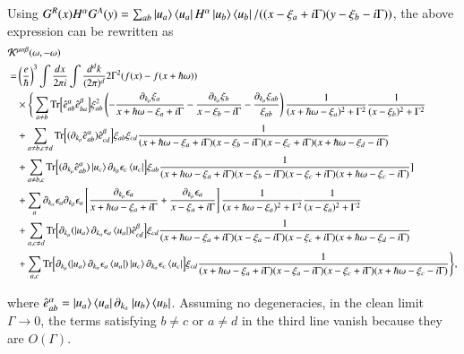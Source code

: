 \documentclass[twocolumn,superscriptaddress]{revtex4-1}
\begin{document}
\begin{widetext}
Using $G^R(x) H^\alpha G^A(y)=\sum_{ab}\ket{u_a}\bra{u_a}H^\alpha\ket{u_b}\bra{u_b}/((x-\xi_a+i\Gamma)(y-\xi_b-i\Gamma))$, the above expression can be rewritten as
\begin{align}
  \mathcal{K}&^{\mu\alpha\beta}(\omega,-\omega)\nonumber \\
  =&\left(\frac{e}{\hbar}\right)^3\int \frac{dx}{2\pi i}\int \frac{d^d k}{(2\pi)^d} 2\Gamma^2 (f(x)-f(x+\hbar\omega)) \nonumber \\
  &\times \Bigg\{\sum_{a\neq b}\Tr[\hat{e}^\alpha_{ab}\hat{e}^\beta_{ba}]\xi_{ab}^2 \left(-\frac{\partial_{k_\mu} \xi_a}{x+\hbar\omega-\xi_a+i\Gamma}-\frac{\partial_{k_\mu} \xi_b}{x-\xi_b-i\Gamma}-\frac{\partial_{k_\mu} \xi_{ab}}{\xi_{ab}}\right)\frac{1}{(x+\hbar\omega-\xi_a)^2+\Gamma^2}\frac{1}{(x-\xi_b)^2+\Gamma^2} \nonumber \\
&+\sum_{a\neq b,c\neq d}\Tr[(\partial_{k_\mu} \hat{e}^\alpha_{ab})\hat{e}^\beta_{cd}]\xi_{ab}\xi_{cd}\frac{1}{(x+\hbar\omega-\xi_a+i\Gamma)(x-\xi_b-i\Gamma)(x-\xi_c+i\Gamma)(x+\hbar\omega-\xi_d-i\Gamma)}\nonumber \\
&+\sum_{a\neq b,c}\Tr[(\partial_{k_\mu} \hat{e}^\alpha_{ab})\ket{u_c}\partial_{k_\beta} \epsilon_c \bra{u_c}]\xi_{ab}\frac{1}{(x+\hbar\omega-\xi_a+i\Gamma)(x-\xi_b-i\Gamma)(x-\xi_c+i\Gamma)(x+\hbar\omega-\xi_c-i\Gamma)}]\nonumber \\
&+\sum_a \partial_{k_\alpha} \epsilon_a \partial_{k_\beta} \epsilon_a \left[\frac{\partial_{k_\mu} \epsilon_a}{x+\hbar\omega -\xi_a+i\Gamma}+\frac{\partial_{k_\mu} \epsilon_a}{x-\xi_a+i\Gamma}\right]\frac{1}{(x+\hbar\omega-\xi_a)^2+\Gamma^2}\frac{1}{(x-\xi_a)^2+\Gamma^2}\nonumber \\
&+\sum_{a,c\neq d}\Tr[\partial_{k_\mu} (\ket{u_a}\partial_{k_\alpha} \epsilon_a \bra{u_a})\hat{e}^\beta_{cd}]\xi_{cd}\frac{1}{(x+\hbar\omega-\xi_a+i\Gamma)(x-\xi_a-i\Gamma)(x-\xi_c+i\Gamma)(x+\hbar\omega-\xi_d-i\Gamma)}\nonumber \\
&+\sum_{a,c}\Tr[\partial_{k_\mu} (\ket{u_a}\partial_{k_\alpha} \epsilon_a \bra{u_a})\ket{u_c}\partial_{k_\alpha} \epsilon_c \bra{u_c}]\xi_{cd}\frac{1}{(x+\hbar\omega-\xi_a+i\Gamma)(x-\xi_a-i\Gamma)(x-\xi_c+i\Gamma)(x+\hbar\omega-\xi_c-i\Gamma)}\Bigg\},
\end{align}
\end{widetext}
where $\hat{e}_{ab}^\alpha=\ket{u_a}\bra{u_a}\partial_{k_\alpha}\ket{u_b}\bra{u_b}$.
Assuming no degeneracies, in the clean limit $\Gamma \to 0$, the terms satisfying $b\neq c$ or $a\neq d$ in the third line vanish because they are $O(\Gamma)$.
\end{document}
